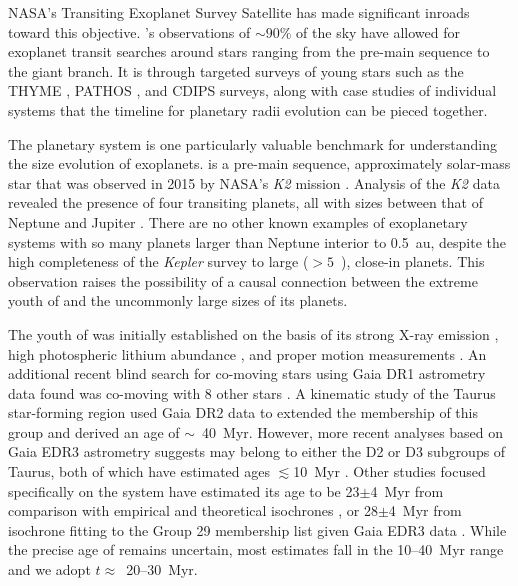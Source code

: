 \documentclass[linenumbers,modern,twocolumn]{aastex631}
\begin{document}
NASA's Transiting Exoplanet Survey Satellite \citep[\tess;][]{Ricker2015} has made significant inroads toward this objective. \tess's observations of $\sim 90 \%$ of the sky have allowed for exoplanet transit searches around stars ranging from the pre-main sequence to the giant branch. It is through targeted surveys of young stars such as the THYME \citep[e.g.][]{Newton2019}, PATHOS \citep[e.g.][]{Nardiello2020}, and CDIPS \citep[e.g.][]{Bouma2020} surveys, along with case studies of individual systems \citep[e.g.][]{benatti19, Plavchan2020, Hedges2021, Zhou2021} that the timeline for planetary radii evolution can be pieced together. 

The \sname planetary system is one particularly valuable benchmark for understanding the size evolution of exoplanets. \sname is a pre-main sequence, approximately solar-mass star that was observed in 2015 by NASA's \textit{K2} mission \citep{Howell2014}. Analysis of the \textit{K2} data revealed the presence of four transiting planets, all with sizes between that of Neptune and Jupiter \citep{David2019a, David2019b}. There are no other known examples of exoplanetary systems with so many planets larger than Neptune interior to 0.5~au, despite the high completeness of the \textit{Kepler} survey to large ($>5$~\rearth), close-in planets. This observation raises the possibility of a causal connection between the extreme youth of \sname and the uncommonly large sizes of its planets.  

The youth of \sname was initially established on the basis of its strong X-ray emission \citep{Wichmann1996}, high photospheric lithium abundance \citep{Wichmann2000}, and proper motion measurements \citep{frink1997}. An additional recent blind search for co-moving stars using Gaia DR1 astrometry data found \sname was co-moving with 8 other stars \citep[Group 29 in][]{Oh2017}. A kinematic study of the Taurus star-forming region \citet{Luhman2018} used Gaia DR2 data to extended the membership of this group and derived an age of $\sim$~40~Myr. However, more recent analyses based on Gaia EDR3 astrometry suggests \sname may belong to either the D2 or D3 subgroups of Taurus, both of which have estimated ages $\lesssim$10~Myr \citep{gaidos21, Krolikowski2021}. Other studies focused specifically on the \sname system have estimated its age to be 23$\pm$4~Myr from comparison with empirical and theoretical isochrones \citep{David2019b}, or 28$\pm$4~Myr from isochrone fitting to the \citet{Luhman2018} Group 29 membership list given Gaia EDR3 data \citep{johnson21}. While the precise age of \sname remains uncertain, most estimates fall in the 10--40~Myr range and we adopt $t \approx$~20--30~Myr.
\end{document}
